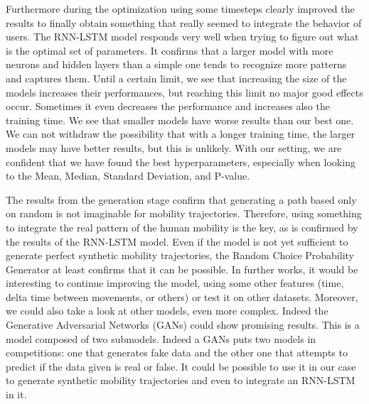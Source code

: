\documentclass[a4]{article}
\begin{document}
Furthermore during the optimization using some timesteps clearly improved the results to finally obtain something that really seemed to integrate the behavior of users. The RNN-LSTM model responds very well when trying to figure out what is the optimal set of parameters. It confirms that a larger model with more neurons and hidden layers than a simple one tends to recognize more patterns and captures them. Until a certain limit, we see that increasing the size of the models increases their performances, but reaching this limit no major good effects occur. Sometimes it even decreases the performance and increases also the training time. We see that smaller models have worse results than our best one. We can not withdraw the possibility that with a longer training time, the larger models may have better results, but this is unlikely. With our setting, we are confident that we have found the best hyperparameters, especially when looking to the Mean, Median, Standard Deviation, and P-value.

The results from the generation stage confirm that generating a path based only on random is not imaginable for mobility trajectories. Therefore, using something to integrate the real pattern of the human mobility is the key, as is confirmed by the results of the RNN-LSTM model. Even if the model is not yet sufficient to generate perfect synthetic mobility trajectories, the Random Choice Probability Generator at least confirms that it can be possible. In further works, it would be interesting to continue improving the model, using some other features (time, delta time between movements, or others) or test it on other datasets. Moreover, we could also take a look at other models, even more complex. Indeed the Generative Adversarial Networks (GANs) could show promising results. This is a model composed of two submodels. Indeed a GANs puts two models in competitions: one that generates fake data and the other one that attempts to predict if the data given is real or false. It could be possible to use it in our case to generate synthetic mobility trajectories and even to integrate an RNN-LSTM in it. 


\newpage
\end{document}
